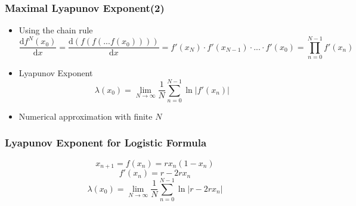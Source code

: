 \documentclass[ignorenonframetext]{beamer}
\newcommand{\dif}{\mathrm{d}}
\begin{document}
\begin{frame}
\frametitle{Maximal Lyapunov Exponent(2)}
\begin{itemize}
\item Using the chain rule
\begin{equation}
\frac{\dif f^N(x_0)}{\dif x}=\frac{\dif (f(f(...f(x_0))))}{\dif x}=
f'(x_N)\cdot f'(x_{N-1})\cdot ...\cdot f'(x_0)=\prod\limits_{n=0}^{N-1} f'(x_n)
\end{equation}
\item Lyapunov Exponent
\begin{equation}
\lambda(x_0)=\lim \limits_{N\rightarrow\infty}\frac{1}{N}\sum\limits_{n=0}^{N-1}\ln|f'(x_n)|
\end{equation}
\item Numerical approximation with finite $N$ 
\end{itemize}
\end{frame}

\begin{frame}
\frametitle{Lyapunov Exponent for Logistic Formula}
\begin{equation}
x_{n+1} = f(x_n)=rx_n(1-x_n)
\end{equation}
\begin{equation}
f'(x_n) = r-2rx_n
\end{equation}
\begin{equation}
\lambda(x_0)= \lim \limits_{N\rightarrow\infty}\frac{1}{N}\sum\limits_{n=0}^{N-1}\ln|r-2rx_n|
\end{equation}
\end{frame}
\end{document}
